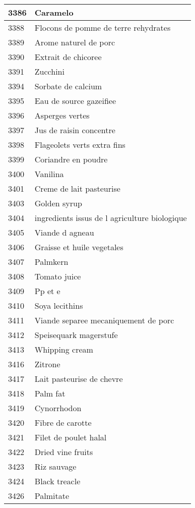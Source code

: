 \begin{longtable}{|l|l|}
3386 & Caramelo \\ \hline 
3388 & Flocons de pomme de terre rehydrates \\ \hline 
3389 & Arome naturel de porc \\ \hline 
3390 & Extrait de chicoree \\ \hline 
3391 & Zucchini \\ \hline 
3394 & Sorbate de calcium \\ \hline 
3395 & Eau de source gazeifiee \\ \hline 
3396 & Asperges vertes \\ \hline 
3397 & Jus de raisin concentre \\ \hline 
3398 & Flageolets verts extra fins \\ \hline 
3399 & Coriandre en poudre \\ \hline 
3400 & Vanilina \\ \hline 
3401 & Creme de lait pasteurise \\ \hline 
3403 & Golden syrup \\ \hline 
3404 &  ingredients issus de l agriculture biologique \\ \hline 
3405 & Viande d agneau \\ \hline 
3406 & Graisse et huile vegetales \\ \hline 
3407 & Palmkern \\ \hline 
3408 & Tomato juice \\ \hline 
3409 & Pp et e \\ \hline 
3410 & Soya lecithins \\ \hline 
3411 & Viande separee mecaniquement de porc \\ \hline 
3412 & Speisequark magerstufe \\ \hline 
3413 & Whipping cream \\ \hline 
3416 & Zitrone \\ \hline 
3417 & Lait pasteurise de chevre \\ \hline 
3418 & Palm fat \\ \hline 
3419 & Cynorrhodon \\ \hline 
3420 & Fibre de carotte \\ \hline 
3421 & Filet de poulet halal \\ \hline 
3422 & Dried vine fruits \\ \hline 
3423 & Riz sauvage \\ \hline 
3424 & Black treacle \\ \hline 
3426 & Palmitate \\ \hline 

\end{longtable}
